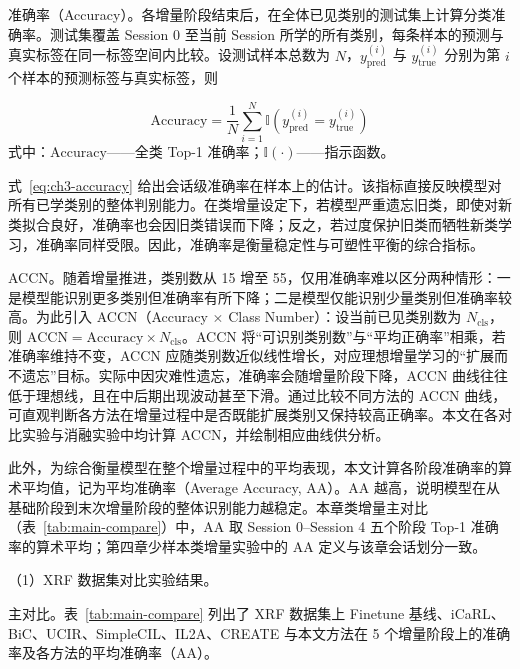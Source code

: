 准确率（Accuracy）。各增量阶段结束后，在全体已见类别的测试集上计算分类准确率。测试集覆盖 Session 0 至当前 Session 所学的所有类别，每条样本的预测与真实标签在同一标签空间内比较。设测试样本总数为 $N$，$y_{\mathrm{pred}}^{(i)}$ 与 $y_{\mathrm{true}}^{(i)}$ 分别为第 $i$ 个样本的预测标签与真实标签，则

\begin{equation}\label{eq:ch3-accuracy}
\text{Accuracy} = \frac{1}{N} \sum_{i=1}^{N} \mathbb{I}\left( y_{\mathrm{pred}}^{(i)} = y_{\mathrm{true}}^{(i)} \right)
\end{equation}
\noindent 式中：$\text{Accuracy}$——全类 Top-1 准确率；$\mathbb{I}(\cdot)$——指示函数。

式~\eqref{eq:ch3-accuracy} 给出会话级准确率在样本上的估计。该指标直接反映模型对所有已学类别的整体判别能力。在类增量设定下，若模型严重遗忘旧类，即使对新类拟合良好，准确率也会因旧类错误而下降；反之，若过度保护旧类而牺牲新类学习，准确率同样受限。因此，准确率是衡量稳定性与可塑性平衡的综合指标。

ACCN。随着增量推进，类别数从 15 增至 55，仅用准确率难以区分两种情形：一是模型能识别更多类别但准确率有所下降；二是模型仅能识别少量类别但准确率较高。为此引入 ACCN（Accuracy $\times$ Class Number）：设当前已见类别数为 $N_{\mathrm{cls}}$，则 $\text{ACCN} = \text{Accuracy} \times N_{\mathrm{cls}}$。ACCN 将“可识别类别数”与“平均正确率”相乘，若准确率维持不变，ACCN 应随类别数近似线性增长，对应理想增量学习的“扩展而不遗忘”目标。实际中因灾难性遗忘，准确率会随增量阶段下降，ACCN 曲线往往低于理想线，且在中后期出现波动甚至下滑。通过比较不同方法的 ACCN 曲线，可直观判断各方法在增量过程中是否既能扩展类别又保持较高正确率。本文在各对比实验与消融实验中均计算 ACCN，并绘制相应曲线供分析。

此外，为综合衡量模型在整个增量过程中的平均表现，本文计算各阶段准确率的算术平均值，记为平均准确率（Average Accuracy, AA）。AA 越高，说明模型在从基础阶段到末次增量阶段的整体识别能力越稳定。本章类增量主对比（表~\ref{tab:main-compare}）中，AA 取 Session 0--Session 4 五个阶段 Top-1 准确率的算术平均；第四章少样本类增量实验中的 AA 定义与该章会话划分一致。


（1）XRF 数据集对比实验结果。

主对比。表~\ref{tab:main-compare} 列出了 XRF 数据集上 Finetune 基线、iCaRL、BiC、UCIR、SimpleCIL、IL2A、CREATE 与本文方法在 5 个增量阶段上的准确率及各方法的平均准确率（AA）。

